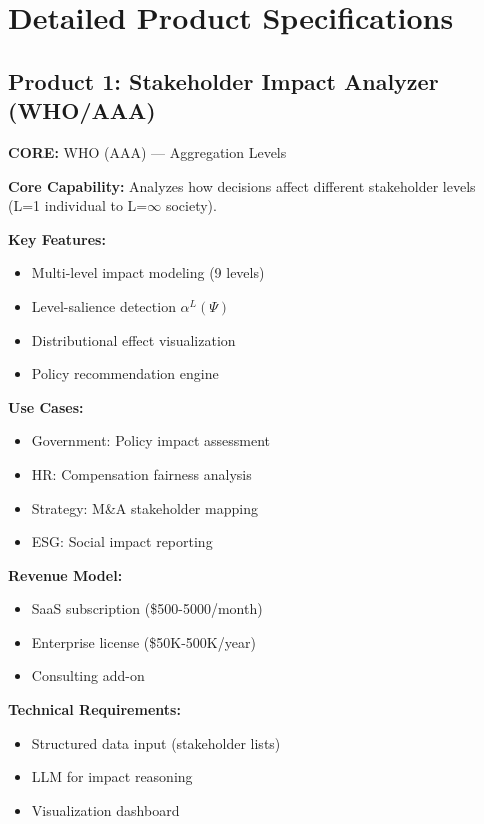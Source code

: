 \section{Detailed Product Specifications}
\label{sec:vvv3-specifications}

\subsection{Product 1: Stakeholder Impact Analyzer (WHO/AAA)}

\begin{tcolorbox}[colback=red!5!white, colframe=red!75!black,
    title=Product: Stakeholder Impact Analyzer]

\textbf{CORE:} WHO (AAA) --- Aggregation Levels

\textbf{Core Capability:}
Analyzes how decisions affect different stakeholder levels (L=1 individual to L=$\infty$ society).

\textbf{Key Features:}
\begin{itemize}[nosep]
\item Multi-level impact modeling (9 levels)
\item Level-salience detection $\alpha^L(\Psi)$
\item Distributional effect visualization
\item Policy recommendation engine
\end{itemize}

\textbf{Use Cases:}
\begin{itemize}[nosep]
\item Government: Policy impact assessment
\item HR: Compensation fairness analysis
\item Strategy: M\&A stakeholder mapping
\item ESG: Social impact reporting
\end{itemize}

\textbf{Revenue Model:}
\begin{itemize}[nosep]
\item SaaS subscription (\$500-5000/month)
\item Enterprise license (\$50K-500K/year)
\item Consulting add-on
\end{itemize}

\textbf{Technical Requirements:}
\begin{itemize}[nosep]
\item Structured data input (stakeholder lists)
\item LLM for impact reasoning
\item Visualization dashboard
\end{itemize}

\end{tcolorbox}


